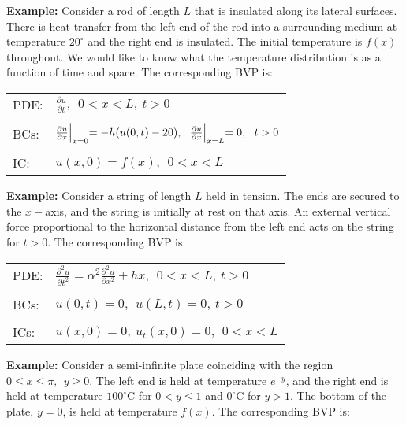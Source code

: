 \vspace{0.15cm}

\noindent\textbf{Example: } Consider a rod of length $L$ that is insulated along its lateral surfaces.  There is heat transfer from the left end of the rod into a surrounding medium at temperature $20^{\circ}$ and the right end is insulated.  The initial temperature is $f(x)$ throughout.  We would like to know what the temperature distribution is as a function of time and space.  The corresponding BVP is:
\begin{table}
\begin{tabular}{l l}
PDE: & $\frac{\partial u}{\partial t}, \ \ 0<x<L, \ t>0 $ \\
& \\
BCs: & $\frac{\partial u}{\partial x}\Bigl|_{x=0} = -h(u(0,t)-20), \ \  \frac{\partial u}{\partial x}\Bigl|_{x=L} = 0, \ \ t>0$ \\
& \\
IC: & $u(x,0) = f(x), \ \ 0<x<L$ \\
\end{tabular}
\end{table}

\vspace{0.25cm}

\noindent\textbf{Example: } Consider a string of length $L$ held in tension.  The ends are secured to the $x-$axis, and the string is initially at rest on that axis.  An external vertical force proportional to the horizontal distance from the left end acts on the string for $t>0$.  The corresponding BVP is:
\begin{table}
\begin{tabular}{l l}
PDE: & $\frac{\partial^2 u}{\partial t^2} = \alpha^2 \frac{\partial^2 u}{\partial x^2} + hx, \ \ 0<x<L, \ t>0 $ \\
& \\
BCs: & $u(0,t)=0, \ \ u(L,t) = 0, \ t>0 $ \\
& \\
ICs: & $u(x,0) = 0, \ u_t(x,0) = 0, \ \ 0<x<L$ \\
\end{tabular}
\end{table}

\vspace{0.25cm}

\noindent\textbf{Example: } Consider a semi-infinite plate coinciding with the region $0 \le x \le \pi, \ \  y\ge 0.$  The left end is held at temperature $e^{-y}$, and the right end is held at temperature $100^{\circ}$C for $0 < y \le 1$ and $0^{\circ}$C for $y>1$.  The bottom of the plate, $y=0$, is held at temperature $f(x)$.  The corresponding BVP is:

